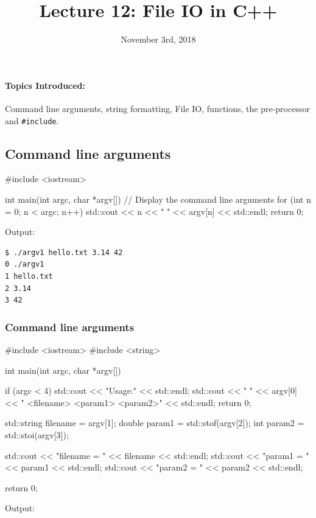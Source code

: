 \documentclass[12pt,letterpaper,twoside]{article}
\begin{document}
\title{Lecture 12: File IO in C++\vspace{-5ex}}
\date{November 3rd, 2018}
\maketitle

{\footnotesize
\paragraph{Topics Introduced:} Command line arguments, string
formatting, File IO, functions, the pre-processor and \texttt{\#include}.
}
\vspace{-3ex}

\subsection{Command line arguments}
\begin{cpp}
#include <iostream>

int main(int argc, char *argv[]) {
  // Display the command line arguments
  for (int n = 0; n < argc; n++) {
    std::cout << n << " " << argv[n] << std::endl;
  }
  return 0;
}
\end{cpp}

Output:

\begin{verbatim}
$ ./argv1 hello.txt 3.14 42
0 ./argv1
1 hello.txt
2 3.14
3 42
\end{verbatim}

\subsubsection{Command line arguments}
\begin{cpp}
#include <iostream>
#include <string>

int main(int argc, char *argv[]) {
  if (argc < 4) {
    std::cout << "Usage:" << std::endl;
    std::cout << " " << argv[0] << " <filename> <param1> <param2>" << std::endl;
    return 0;
  }

  std::string filename = argv[1];
  double param1 = std::stof(argv[2]);
  int param2 = std::stoi(argv[3]);

  std::cout << "filename = " << filename << std::endl;
  std::cout << "param1 = " << param1 << std::endl;
  std::cout << "param2 = " << param2 << std::endl;

  return 0;
}
\end{cpp}

Output:
\end{document}

